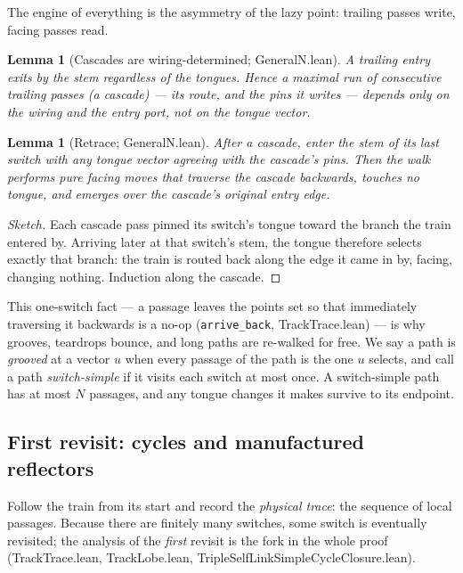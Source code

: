 \documentclass[11pt]{article}
\newtheorem{lemma}[theorem]{Lemma}
\theoremstyle{definition}
\newcommand{\lean}[1]{\texttt{#1}}
\newcommand{\file}[1]{\textsf{#1}}
\begin{document}
The engine of everything is the asymmetry of the lazy point: trailing
passes write, facing passes read.

\begin{lemma}[Cascades are wiring-determined; \file{GeneralN.lean}]
  \label{lem:cascade}
  A trailing entry exits by the stem regardless of the tongues.  Hence a
  maximal run of consecutive trailing passes (a \emph{cascade}) --- its
  route, and the pins it writes --- depends only on the wiring and the
  entry port, not on the tongue vector.
\end{lemma}

\begin{lemma}[Retrace; \file{GeneralN.lean}]\label{lem:retrace}
  After a cascade, enter the \emph{stem} of its last switch with any
  tongue vector agreeing with the cascade's pins.  Then the walk performs
  pure facing moves that traverse the cascade backwards, touches no
  tongue, and emerges over the cascade's original entry edge.
\end{lemma}

\begin{proof}[Sketch]
  Each cascade pass pinned its switch's tongue toward the branch the
  train entered by.  Arriving later at that switch's stem, the tongue
  therefore selects exactly that branch: the train is routed back along
  the edge it came in by, facing, changing nothing.  Induction along the
  cascade.
\end{proof}

This one-switch fact --- a passage leaves the points set so that
immediately traversing it backwards is a no-op
(\lean{arrive\_back}, \file{TrackTrace.lean}) --- is why grooves,
teardrops bounce, and long paths are re-walked for free.  We say a path
is \emph{grooved} at a vector $u$ when every passage of the path is the
one $u$ selects, and call a path \emph{switch-simple} if it visits each
switch at most once.  A switch-simple path has at most $N$ passages, and
any tongue changes it makes survive to its endpoint.

\subsection{First revisit: cycles and manufactured reflectors}
\label{ssec:traces}

Follow the train from its start and record the \emph{physical trace}:
the sequence of local passages.  Because there are finitely many
switches, some switch is eventually revisited; the analysis of the
\emph{first} revisit is the fork in the whole proof
(\file{TrackTrace.lean}, \file{TrackLobe.lean},
\file{TripleSelfLinkSimpleCycleClosure.lean}).
\end{document}

